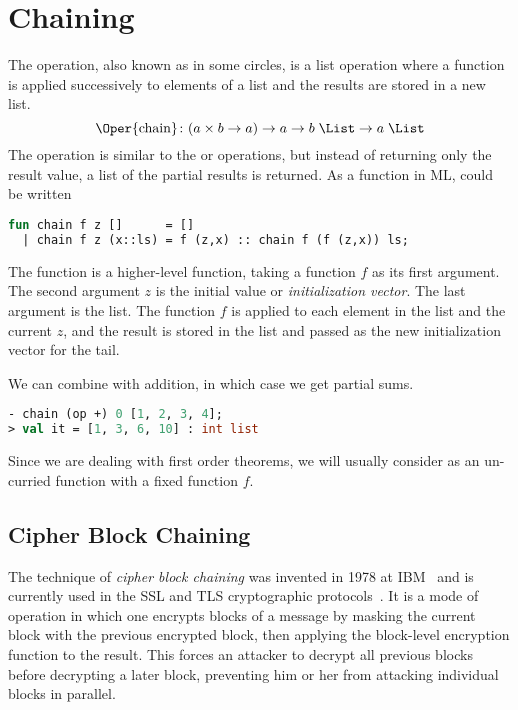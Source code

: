 \chapter{Chaining}\label{chap:chaining}

The  operation, also known as  in some circles, is a
list operation where a function is applied successively to elements of a list
and the results are stored in a new list.
\[ \text{\Oper{chain}} \colon (a \times b \to a) \to a \to b \; \List \to a \; \List \]
The operation is similar to the
 or  operations, but instead of returning
only the result value, a list of the partial results is returned. As a function
in ML,  could be written
\begin{lstlisting}[language=ML, style=Inline]
fun chain f z []      = []
  | chain f z (x::ls) = f (z,x) :: chain f (f (z,x)) ls;
\end{lstlisting}
The  function is a higher-level function, taking a function
$f$ as its first argument. The second argument $z$ is the initial value or
\emph{initialization vector}. The last argument is the list. The function
$f$ is applied to each element in the list and the current $z$, and the
result is stored in the list and passed as the new initialization vector
for the tail.

\begin{Example}
We can combine  with addition, in
    which case we get partial sums.
    \begin{lstlisting}[language=ML, style=Inline]
- chain (op +) 0 [1, 2, 3, 4];
> val it = [1, 3, 6, 10] : int list
    \end{lstlisting}
\end{Example}

Since we are dealing with first order theorems, we will usually consider
 as an un-curried function with a fixed function $f$.



\section{Cipher Block Chaining}\label{sec:cbc}

The technique of \emph{cipher block chaining} was invented in 1978 at
IBM~\cite{ehrsam1978message} and is currently used in the SSL and TLS
cryptographic protocols~\cite{rfc5246}. It is a mode of operation in which one
encrypts blocks of a message by masking the current block with the previous
encrypted block, then applying the block-level encryption function to the
result. This forces an attacker to decrypt all previous blocks before
decrypting a later block, preventing him or her from attacking individual
blocks in parallel.

